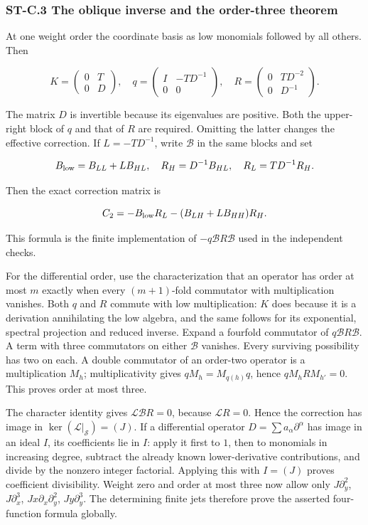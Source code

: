 \documentclass[a4paper,11pt]{article}
\numberwithin{equation}{section}
\begin{document}
\hypertarget{st-c.3-the-oblique-inverse-and-the-order-three-theorem}{%
\subsubsection{ST-C.3 The oblique inverse and the order-three theorem}\label{st-c.3-the-oblique-inverse-and-the-order-three-theorem}}

At one weight order the coordinate basis as low monomials followed by all others. Then

\[
K=\begin{pmatrix}0&T\\0&D\end{pmatrix},\quad
q=\begin{pmatrix}I&-TD^{-1}\\0&0\end{pmatrix},\quad
R=\begin{pmatrix}0&TD^{-2}\\0&D^{-1}\end{pmatrix}.
\]

The matrix \(D\) is invertible because its eigenvalues are positive. Both the upper-right block of \(q\) and that of \(R\) are required. Omitting the latter changes the effective correction. If \(L=-TD^{-1}\), write \(\mathscr B\) in the same blocks and set

\[
B_{\rm low}=B_{LL}+LB_{HL},\quad
R_H=D^{-1}B_{HL},\quad R_L=TD^{-1}R_H.
\]

Then the exact correction matrix is

\[
C_2=-B_{\rm low}R_L-(B_{LH}+LB_{HH})R_H.
\]

This formula is the finite implementation of \(-q\mathscr BR\mathscr B\) used in the independent checks.

For the differential order, use the characterization that an operator has order at most \(m\) exactly when every \((m+1)\)-fold commutator with multiplication vanishes. Both \(q\) and \(R\) commute with low multiplication: \(K\) does because it is a derivation annihilating the low algebra, and the same follows for its exponential, spectral projection and reduced inverse. Expand a fourfold commutator of \(q\mathscr BR\mathscr B\). A term with three commutators on either \(\mathscr B\) vanishes. Every surviving possibility has two on each. A double commutator of an order-two operator is a multiplication \(M_h\); multiplicativity gives \(qM_h=M_{q(h)}q\), hence \(qM_hR M_{h'}=0\). This proves order at most three.

The character identity gives \(\mathcal L\mathscr BR=0\), because \(\mathcal LR=0\). Hence the correction has image in \(\ker(\mathcal L|_{\mathcal S})=(J)\). If a differential operator \(D=\sum a_\alpha\partial^\alpha\) has image in an ideal \(I\), its coefficients lie in \(I\): apply it first to \(1\), then to monomials in increasing degree, subtract the already known lower-derivative contributions, and divide by the nonzero integer factorial. Applying this with \(I=(J)\) proves coefficient divisibility. Weight zero and order at most three now allow only \(J\partial_y^2\), \(J\partial_x^3\), \(Jx\partial_x\partial_y^2\), \(Jy\partial_y^3\). The determining finite jets therefore prove the asserted four-function formula globally.
\end{document}
